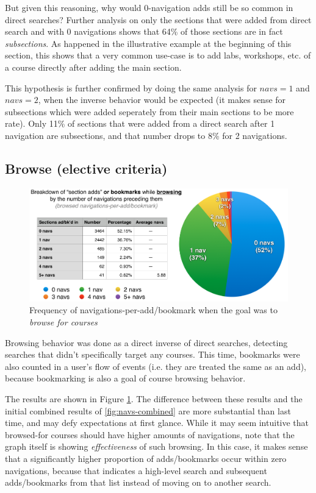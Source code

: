   But given this reasoning, why would 0-navigation adds still be so common in direct searches? Further analysis on only the sections that were added from direct search and with 0 navigations shows that 64\% of those sections are in fact \emph{subsections}. As happened in the illustrative example at the beginning of this section, this shows that a very common use-case is to add labs, workshops, etc. of a course directly after adding the main section.

  This hypothesis is further confirmed by doing the same analysis for ${navs}=1$ and ${navs}=2$, when the inverse behavior would be expected (it makes sense for subsections which were added seperately from their main sections to be more rate). Only 11\% of sections that were added from a direct search after 1 navigation are subsections, and that number drops to 8\% for 2 navigations.

\subsection{Browse (elective criteria)}

  \begin{figure}
    \centering
    \includegraphics[width=1.0\textwidth]{images/graph/browsed_navs}

    \caption{Frequency of navigations-per-add/bookmark when the goal was to \emph{browse for courses}}
    \label{fig:navs-browse}
  \end{figure}

  Browsing behavior was done as a direct inverse of direct searches, detecting searches that didn't specifically target any courses. This time, bookmarks were also counted in a user's flow of events (i.e. they are treated the same as an add), because bookmarking is also a goal of course browsing behavior.

  The results are shown in Figure \ref{fig:navs-browse}. The difference between these results and the initial combined results of \ref{fig:navs-combined} are more substantial than last time, and may defy expectations at first glance. While it may seem intuitive that browsed-for courses should have higher amounts of navigations, note that the graph itself is showing \emph{effectiveness} of such browsing. In this case, it makes sense that a significantly higher proportion of adds/bookmarks occur within zero navigations, because that indicates a high-level search and subsequent adds/bookmarks from that list instead of moving on to another search.

